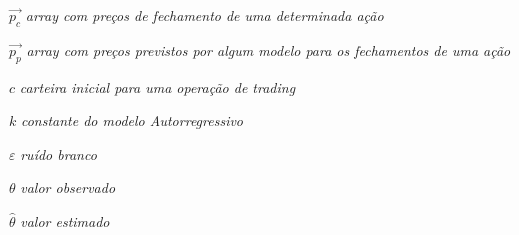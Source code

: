 \documentclass[
	12pt,				%
	openany,			%
	oneside,
	a4paper,			%
	english,			%
	spanish,			%
	brazil				%
	]{ufscar}
\makeatletter
\def\numberline#1{\hb@xt@\@tempdima{#1\hfil}}
\makeatother
\begin{document}

\setcounter{page}{3}

\listoffigures*
\cleardoublepage

\setcounter{page}{4}

\listoftables*
\cleardoublepage

\listofalgorithms
\setcounter{page}{5}
\cleardoublepage

\makeatletter
\def\numberline#1{\hb@xt@\@tempdima{#1\hfil}}
\makeatother

\begin{simbolos}
\setcounter{page}{6}
\item[$ \vec{p_c} $] \textit{array com preços de fechamento de uma determinada ação}
\item[$ \vec{p_p} $] \textit{array com preços previstos por algum modelo para os fechamentos de uma ação}
\item[$ c $] \textit{carteira inicial para uma operação de trading}
\item[$ k $] \textit{constante do modelo Autorregressivo}
\item[$ \varepsilon $] \textit{ruído branco}
\item[$ \theta $] \textit{valor observado}
\item[$ \hat{\theta} $] \textit{valor estimado}
\end{simbolos}
\end{document}

